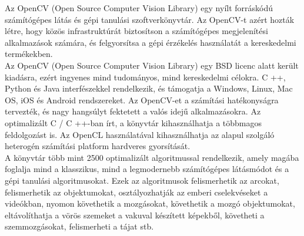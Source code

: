 

Az OpenCV (Open Source Computer Vision Library) egy nyílt forráskódú számítógépes látás és gépi tanulási szoftverkönyvtár. Az OpenCV-t azért hozták létre, hogy közös infrastruktúrát biztosítson a számítógépes megjelenítési alkalmazások számára, és felgyorsítsa a gépi érzékelés használatát a kereskedelmi termékekben. 
\\

\noindent Az OpenCV (Open Source Computer Vision Library) egy BSD licenc alatt került kiadásra, ezért ingyenes mind tudományos, mind kereskedelmi célokra. C ++, Python és Java interfészekkel rendelkezik, és támogatja a Windows, Linux, Mac OS, iOS és Android rendszereket. Az OpenCV-et a számítási hatékonyságra tervezték, és nagy hangsúlyt fektetett a valós idejű alkalmazásokra. Az optimalizált C / C ++-ban írt, a könyvtár kihasználhatja a többmagos feldolgozást is. Az OpenCL használatával kihasználhatja az alapul szolgáló heterogén számítási platform hardveres gyorsítását.
\\

\noindent A könyvtár több mint 2500 optimalizált algoritmussal rendelkezik, amely magába foglalja mind a klasszikus, mind a legmodernebb számítógépes látásmódot és a gépi tanulási algoritmusokat. Ezek az algoritmusok felismerhetik az arcokat, felismerhetik az objektumokat, osztályozhatják az emberi cselekvéseket a videókban, nyomon követhetik a mozgásokat, követhetik a mozgó objektumokat, eltávolíthatja a vörös szemeket a vakuval készített képekből, követheti a szemmozgásokat, felismerheti a tájat stb. 
\\






